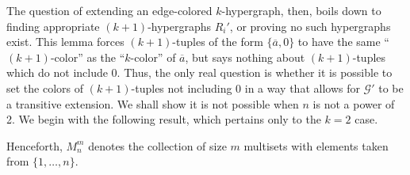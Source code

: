 \documentclass{amsart}
\def\graph{\mathcal{G}}
\newcommand{\set}[1]{\{#1 \}}
\begin{document}
The question of extending an edge-colored $k$-hypergraph, then, boils down to finding appropriate $(k+1)$-hypergraphs $R_i'$, or proving no such hypergraphs exist. This lemma forces $(k+1)$-tuples of the form $\{\overline{a}, 0\}$ to have the same ``$(k+1)$-color'' as the ``$k$-color'' of $\overline{a}$, but says nothing about $(k+1)$-tuples which do not include 0. Thus, the only real question is whether it is possible to set the colors of $(k+1)$-tuples not including 0 in a way that allows for $\graph'$ to be a transitive extension. We shall show it is not possible when $n$ is not a power of 2. We begin with the following result, which pertains only to the $k = 2$ case.

Henceforth, $M_n^m$ denotes the collection of size $m$ multisets with elements taken from $\set{1, \dots, n}$.
\end{document}
